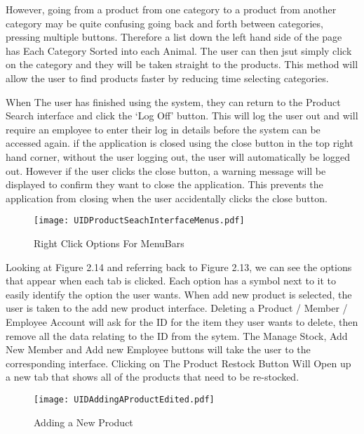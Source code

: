 However, going from a product from one category to a product from another category may be quite confusing going back and forth between categories, pressing multiple buttons. Therefore a list down the left hand side of the page has Each Category Sorted into each Animal. The user can then jsut simply click on the category and they will be taken straight to the products. This method will allow the user to find products faster by reducing time selecting categories. \par

When The user has finished using the system, they can return to the Product Search interface and click the `Log Off' button. This will log the user out and will require an employee to enter their log in details before the system can be accessed again. if the application is closed using the close button in the top right hand corner, without the user logging out, the user will automatically be logged out. However if the user clicks the close button, a warning message will be displayed to confirm they want to close the application. This prevents the application from closing when the user accidentally clicks the close button. \par

\begin{figure}[H]
\caption{Right Click Options For MenuBars} \label{fig:Right Click Options For MenuBars}
\hfill\texttt{[image: UIDProductSeachInterfaceMenus.pdf]}\hspace*{\fill}
\end{figure}

Looking at Figure 2.14 and referring back to Figure 2.13, we can see the options that appear when each tab is clicked. Each option has a symbol next to it to easily identify the option the user wants. When add new product is selected, the user is taken to the add new product interface. Deleting a Product / Member / Employee Account will ask for the ID for the item they user wants to delete, then remove all the data relating to the ID from the sytem. The Manage Stock, Add New Member and Add new Employee buttons will take the user to the corresponding interface. Clicking on The Product Restock Button Will Open up a new tab that shows all of the products that need to be re-stocked. \par

\begin{figure}[H]
\caption{Adding a New Product} \label{fig:Adding a New Product Interface}
\hfill\texttt{[image: UIDAddingAProductEdited.pdf]}\hspace*{\fill}
\end{figure}

